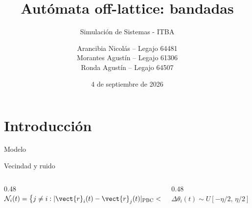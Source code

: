 \documentclass[aspectratio=169]{beamer}
\title{Autómata off-lattice: bandadas}
\subtitle{Simulación de Sistemas - ITBA}
\author[Grupo 2]{%
  Arancibia Nicolás -- Legajo 64481\\
  Morantes Agustín -- Legajo 61306\\
  Ronda Agustín -- Legajo 64507}
\institute[ITBA]{Grupo 2 --- Comisión S2 --- Instituto Tecnológico de Buenos Aires}
\date{4 de septiembre de 2026}
\begin{document}
\begin{frame}[plain]
  \titlepage
\end{frame}

\section{Introducción}

\begin{frame}{Modelo}
  \begin{block}{Vecindad y ruido}
    \begin{columns}[T,onlytextwidth]
      \begin{column}{0.48\textwidth}
        \centering
        \(
          \displaystyle
          \mathcal{N}_i(t)=\bigl\{j\neq i:
          \lvert\vect{r}_i(t)-\vect{r}_j(t)\rvert_{\mathrm{PBC}}<r_c\bigr\}
        \)
      \end{column}
      \begin{column}{0.48\textwidth}
        \centering
        \(
          \displaystyle
          \Delta\theta_i(t)\sim U[-\eta/2,\,\eta/2]
        \)
      \end{column}
    \end{columns}
  \end{block}


\end{frame}
\end{document}
